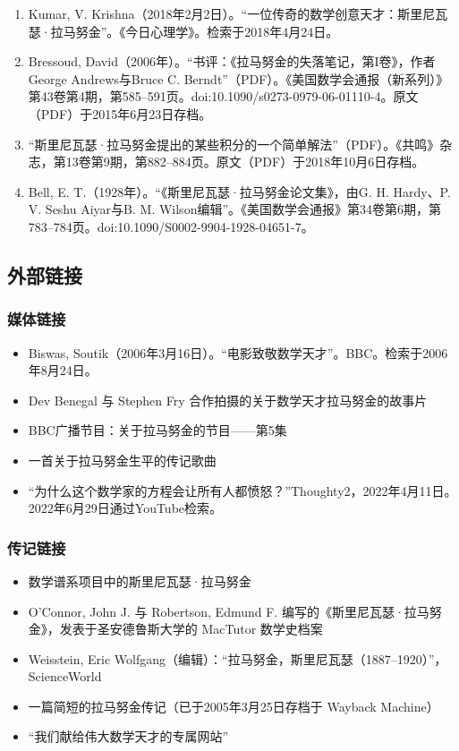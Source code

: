 \begin{enumerate}
\item Kumar, V. Krishna（2018年2月2日）。“一位传奇的数学创意天才：斯里尼瓦瑟·拉马努金”。《今日心理学》。检索于2018年4月24日。
\item Bressoud, David（2006年）。“书评：《拉马努金的失落笔记，第I卷》，作者George Andrews与Bruce C. Berndt”（PDF）。《美国数学会通报（新系列）》第43卷第4期，第585–591页。doi:10.1090/s0273-0979-06-01110-4。原文（PDF）于2015年6月23日存档。
\item “斯里尼瓦瑟·拉马努金提出的某些积分的一个简单解法”（PDF）。《共鸣》杂志，第13卷第9期，第882–884页。原文（PDF）于2018年10月6日存档。
\item Bell, E. T.（1928年）。“《斯里尼瓦瑟·拉马努金论文集》，由G. H. Hardy、P. V. Seshu Aiyar与B. M. Wilson编辑”。《美国数学会通报》第34卷第6期，第783–784页。doi:10.1090/S0002-9904-1928-04651-7。
\end{enumerate}
\subsection{外部链接}
\subsubsection{媒体链接}
\begin{itemize}
\item Biswas, Soutik（2006年3月16日）。“电影致敬数学天才”。BBC。检索于2006年8月24日。
\item Dev Benegal 与 Stephen Fry 合作拍摄的关于数学天才拉马努金的故事片
\item BBC广播节目：关于拉马努金的节目——第5集
\item 一首关于拉马努金生平的传记歌曲
\item “为什么这个数学家的方程会让所有人都愤怒？”Thoughty2，2022年4月11日。2022年6月29日通过YouTube检索。
\end{itemize}
\subsubsection{传记链接}
\begin{itemize}
\item 数学谱系项目中的斯里尼瓦瑟·拉马努金
\item O'Connor, John J. 与 Robertson, Edmund F. 编写的《斯里尼瓦瑟·拉马努金》，发表于圣安德鲁斯大学的 MacTutor 数学史档案
\item Weisstein, Eric Wolfgang（编辑）：“拉马努金，斯里尼瓦瑟（1887–1920）”，ScienceWorld
\item 一篇简短的拉马努金传记（已于2005年3月25日存档于 Wayback Machine）
\item “我们献给伟大数学天才的专属网站”
\end{itemize}
